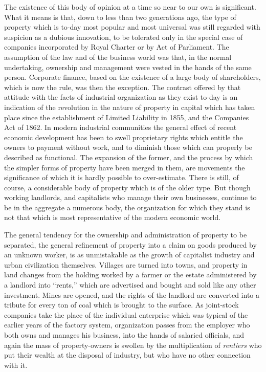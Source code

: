 \documentclass{book}
\begin{document}
The existence of this body of opinion at a time so near to our own is significant. What it means is that, down to less than two generations ago, the type of property which is to-day most popular and most universal was still regarded with suspicion as a dubious innovation, to be tolerated only in the special case of companies incorporated by Royal Charter or by Act of Parliament. The assumption of the law and of the business world was that, in the normal undertaking, ownership and management were vested in the hands of the same person. Corporate finance, based on the existence of a large body of shareholders, which is now the rule, was then the exception. The contrast offered by that attitude with the facts of industrial organization as they exist to-day is an indication of the revolution in the nature of property in capital which has taken place since the establishment of Limited Liability in 1855, and the Companies Act of 1862. In modern industrial communities the general effect of recent economic development has been to swell proprietary rights which entitle the owners to payment without work, and to diminish those which can properly be described as functional. The expansion of the former, and the process by which the simpler forms of property have been merged in them, are movements the significance of which it is hardly possible to over-estimate. There is still, of course, a considerable body of property which is of the older type. But though working landlords, and capitalists who manage their own businesses, continue to be in the aggregate a numerous body, the organization for which they stand is not that which is most representative of the modern economic world.

The general tendency for the ownership and administration of property to be separated, the general refinement of property into a claim on goods produced by an unknown worker, is as unmistakable as the growth of capitalist industry and urban civilization themselves. Villages are turned into towns, and property in land changes from the holding worked by a farmer or the estate administered by a landlord into “rents,” which are advertised and bought and sold like any other investment. Mines are opened, and the rights of the landlord are converted into a tribute for every ton of coal which is brought to the surface. As joint-stock companies take the place of the individual enterprise which was typical of the earlier years of the factory system, organization passes from the employer who both owns and manages his business, into the hands of salaried officials, and again the mass of property-owners is swollen by the multiplication of \emph{rentiers} who put their wealth at the disposal of industry, but who have no other connection with it.
\end{document}
